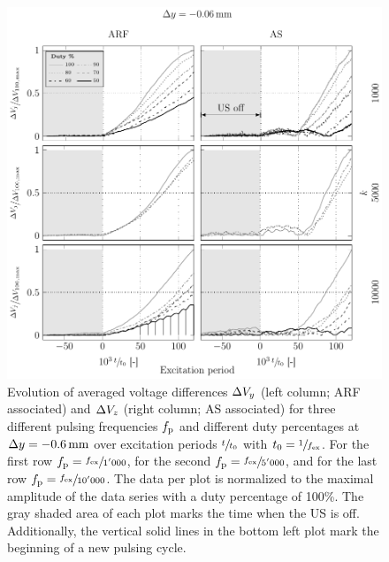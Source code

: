 \begin{figure}[tbp]
  \centering
  \includegraphics[]{External/PU-duty-m06.pdf}
  \caption{Evolution of averaged voltage differences $\Delta V_{y}$ (left column; 
    ARF associated) and $\Delta V_{z}$ (right column; AS associated) for three 
    different pulsing frequencies $f_{\mathrm{p}}$ and different duty percentages at 
    $\Dy=\SI{-0.6}{\mm}$ over excitation periods $\sfrac{t}{t_{0}}$ with 
    $t_{0}=\sfrac{1}{f_{\mathrm{ex}}}$. For the first row $f_{\mathrm{p}}=\sfrac{f_{\mathrm{ex}}}{1'000}$, for 
    the second $f_{\mathrm{p}}=\sfrac{f_{\mathrm{ex}}}{5'000}$, and for the last row 
    $f_{\mathrm{p}}=\sfrac{f_{\mathrm{ex}}}{10'000}$. The data per plot is normalized to the maximal 
    amplitude of the data series with a duty percentage of 100\%. The gray 
    shaded area of each plot marks the time when the US is off. Additionally, 
    the vertical solid lines in the bottom left plot mark the beginning of a 
    new pulsing cycle.
}\label{fig:PU-duty-m06}
\end{figure}


